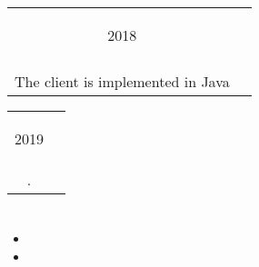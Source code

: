 \documentclass{article}
\newif\ifen
\newif\ifru
\newcommand{\en}[1]{\ifen#1\fi}
\newcommand{\ru}[1]{\ifru#1\fi}
\newcommand{\entry}[3]{
	\begin{tabular}{ c | c }
    \begin{minipage}{0.05\linewidth}
    	\begin{center}
    		#1
    	\end{center}
    \end{minipage} 
    &
    \begin{minipage}{0.85\linewidth}
        \textbf{#2} \\ \footnotesize{#3}
    \end{minipage}
    \end{tabular}
}
\begin{document}
        \entry{2018}
        {\ru{Клиент-серверное приложение}\en{Client-Server Application}}
        {\ru{Сервер реализован на языке Python3 (Flask, SQLAlchemy);\\
        Клиент -- на языке Java}\en{The server is implemented in Python3 (Flask, SQLAlchemy)\\The client is implemented in Java}.} 
    

    
        \vspace{.5em}

        \entry{2019}
        {\ru{Симулятор движения небесных тел}\en{Celestial bodies motion simulator}}
        {\ru{Решение задачи $n$ тел с помощью метода Рунге-Кутта 1-го порядка на Python3 с использованием NumPy}\en{Solving n-body problem with 1st order Runge-Kutta method in Python3 using NumPy}.}
    
        \vspace{.5em}

    \section{\ru{Достижения}}
        \begin{itemize}
            \item \ru{Победитель первой степени олимпиады ИТМО по информатике}
            \item \ru{Хакатон TulaHack - 4 место}
        \end{itemize}

\end{document}
